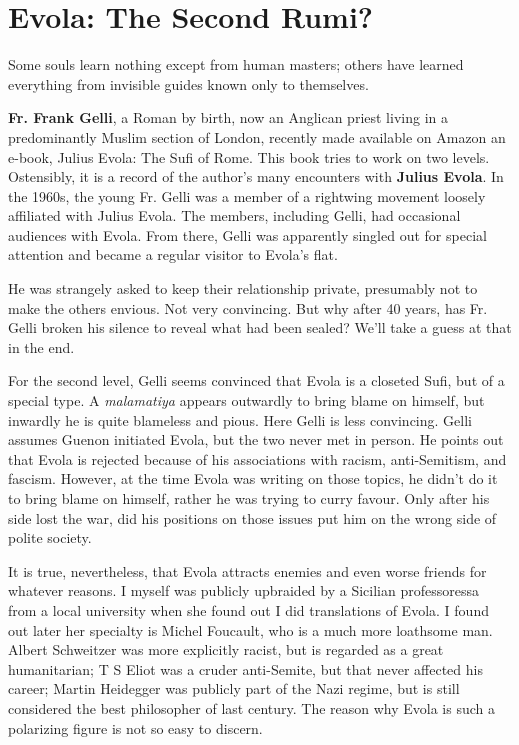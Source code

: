 \section{Evola: The Second Rumi?}

\begin{quotex}
Some souls learn nothing except from human masters; others have learned everything from invisible guides known only to themselves.
\end{quotex}


\textbf{Fr. Frank Gelli}, a Roman by birth, now an Anglican priest living in a predominantly Muslim section of London, recently made available on Amazon an e-book, Julius Evola: The Sufi of Rome. This book tries to work on two levels. Ostensibly, it is a record of the author's many encounters with \textbf{Julius Evola}. In the 1960s, the young Fr. Gelli was a member of a rightwing movement loosely affiliated with Julius Evola. The members, including Gelli, had occasional audiences with Evola. From there, Gelli was apparently singled out for special attention and became a regular visitor to Evola's flat.

He was strangely asked to keep their relationship private, presumably not to make the others envious. Not very convincing. But why after 40 years, has Fr. Gelli broken his silence to reveal what had been sealed? We'll take a guess at that in the end.

For the second level, Gelli seems convinced that Evola is a closeted Sufi, but of a special type. A \emph{malamatiya} appears outwardly to bring blame on himself, but inwardly he is quite blameless and pious. Here Gelli is less convincing. Gelli assumes Guenon initiated Evola, but the two never met in person. He points out that Evola is rejected because of his associations with racism, anti-Semitism, and fascism. However, at the time Evola was writing on those topics, he didn't do it to bring blame on himself, rather he was trying to curry favour. Only after his side lost the war, did his positions on those issues put him on the wrong side of polite society.

It is true, nevertheless, that Evola attracts enemies and even worse friends for whatever reasons. I myself was publicly upbraided by a Sicilian professoressa from a local university when she found out I did translations of Evola. I found out later her specialty is Michel Foucault, who is a much more loathsome man. Albert Schweitzer was more explicitly racist, but is regarded as a great humanitarian; T S Eliot was a cruder anti-Semite, but that never affected his career; Martin Heidegger was publicly part of the Nazi regime, but is still considered the best philosopher of last century. The reason why Evola is such a polarizing figure is not so easy to discern.

